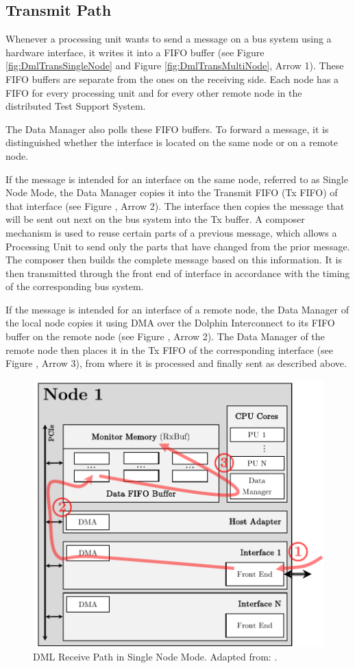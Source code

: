 \subsection{Transmit Path}

Whenever a processing unit wants to send a message on a bus system using a hardware interface, it writes it into a FIFO buffer (see Figure \ref{fig:DmlTransSingleNode} and Figure \ref{fig:DmlTransMultiNode}, Arrow 1). These FIFO buffers are separate from the ones on the receiving side. Each node has a FIFO for every processing unit and for every other remote node in the distributed Test Support System.

The Data Manager also polls these FIFO buffers. To forward a message, it is distinguished whether the interface is located on the same node or on a remote node.

If the message is intended for an interface on the same node, referred to as Single Node Mode, the Data Manager copies it into the Transmit FIFO (Tx FIFO) of that interface (see Figure \label{fig:DmlTransSingleNode}, Arrow 2). The interface then copies the message that will be sent out next on the bus system into the Tx buffer. A composer mechanism is used to reuse certain parts of a previous message, which allows a Processing Unit to send only the parts that have changed from the prior message. The composer then builds the complete message based on this information. It is then transmitted through the front end of interface in accordance with the timing of the corresponding bus system.

If the message is intended for an interface of a remote node, the Data Manager of the local node copies it using DMA over the Dolphin Interconnect to its FIFO buffer on the remote node (see Figure \label{fig:DmlTransMultiNode}, Arrow 2). The Data Manager of the remote node then places it in the Tx FIFO of the corresponding interface (see Figure \label{fig:DmlTransMultiNode}, Arrow 3), from where it is processed and finally sent as described above.

\clearpage

\begin{figure}[!htbp]
    \centering
    \includegraphics[width=0.65\linewidth]{figures/dml/dml02a.pdf}
    \caption[DML Receive Path in Single Node Mode]{DML Receive Path in Single Node Mode. Adapted from: \cite{dml01}.}
    \label{fig:DmlRecSingleNode}
\end{figure}

